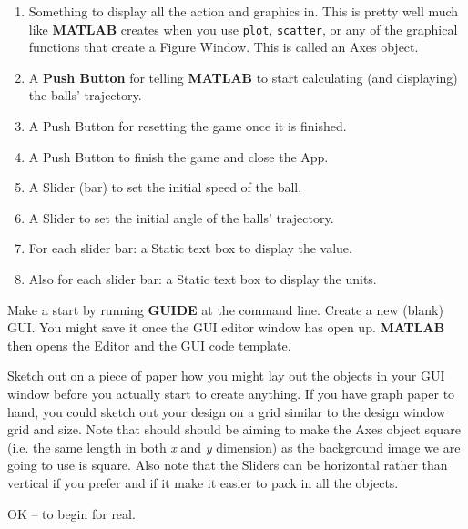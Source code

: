 \documentclass{tufte-book} %
\begin{document}
\begin{enumerate}[noitemsep]
\setlength{\itemindent}{.2in}
\item Something to display all the action and graphics in. This is pretty well much like \textbf{MATLAB} creates when you use \texttt{plot}, \texttt{scatter}, or any of the graphical functions that create a \textsf{Figure Window}. This is called an \textsf{Axes} object. 
\item A \textbf{Push Button} for telling \textbf{MATLAB} to start calculating (and displaying) the balls' trajectory.
\item A \textsf{Push Button} for resetting the game once it is finished.
\item A \textsf{Push Button} to finish the game and close the App.
\item A \textsf{Slider} (bar) to set the initial speed of the ball.
\item A \textsf{Slider} to set the initial angle of the balls' trajectory.
\item For each slider bar: a \textsf{Static text box} to display the value.
\item Also for each slider bar: a \textsf{Static text box} to display the units.
\end{enumerate}

Make a start by running \textbf{GUIDE} at the command line. Create a new (blank) GUI. You might save it once the GUI editor window has open up. \textbf{MATLAB} then opens the \textsf{Editor} and the GUI code template.

Sketch out on a piece of paper how you might lay out the objects in your GUI window before you actually start to create anything.
If you have graph paper to hand, you could sketch out your design on a grid similar to the design window grid and size. Note that should should be aiming to make the \textsf{Axes} object square (i.e. the same length in both \textit{x} and \textit{y} dimension) as the background image we are going to use is square. Also note that the \textsf{Sliders} can be horizontal rather than vertical if you prefer and if it make it easier to pack in all the objects.

OK -- to begin for real.
\end{document}
